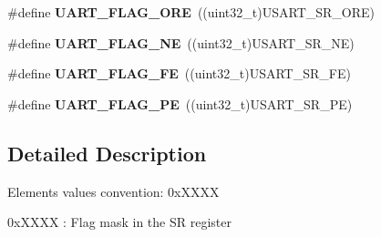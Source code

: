 \begin{DoxyCompactItemize}
\#define {\bfseries U\+A\+R\+T\+\_\+\+F\+L\+A\+G\+\_\+\+O\+RE}~((uint32\+\_\+t)U\+S\+A\+R\+T\+\_\+\+S\+R\+\_\+\+O\+RE)
\item 
\mbox{\label{group___u_a_r_t___flags_ga665981434d02ff5296361782c1a7d4b5}} 
\#define {\bfseries U\+A\+R\+T\+\_\+\+F\+L\+A\+G\+\_\+\+NE}~((uint32\+\_\+t)U\+S\+A\+R\+T\+\_\+\+S\+R\+\_\+\+NE)
\item 
\mbox{\label{group___u_a_r_t___flags_gafba4891ce21cf5223ca5fede0eac388d}} 
\#define {\bfseries U\+A\+R\+T\+\_\+\+F\+L\+A\+G\+\_\+\+FE}~((uint32\+\_\+t)U\+S\+A\+R\+T\+\_\+\+S\+R\+\_\+\+FE)
\item 
\mbox{\label{group___u_a_r_t___flags_gad5b96f73f6d3a0b58f07e2e9d7bf14d9}} 
\#define {\bfseries U\+A\+R\+T\+\_\+\+F\+L\+A\+G\+\_\+\+PE}~((uint32\+\_\+t)U\+S\+A\+R\+T\+\_\+\+S\+R\+\_\+\+PE)
\end{DoxyCompactItemize}


\subsection{Detailed Description}
Elements values convention\+: 0x\+X\+X\+XX
\begin{DoxyItemize}
\item 0x\+X\+X\+XX \+: Flag mask in the SR register 
\end{DoxyItemize}